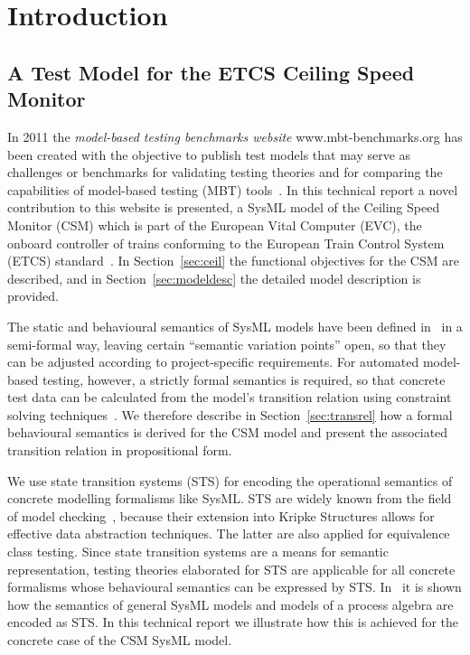 \section{Introduction}\label{sec:intro}

\subsection{A Test Model for the ETCS Ceiling Speed Monitor}
In 2011 the {\it model-based testing benchmarks website} www.mbt-benchmarks.org has been 
created with the objective to publish test models that may serve as challenges or benchmarks 
for validating testing theories   and for comparing the capabilities of model-based testing (MBT) tools~\cite{pel2011a}.
In this technical report a novel contribution to this website is presented, a SysML model
of the Ceiling Speed Monitor (CSM) which is part of the European Vital Computer (EVC), the onboard controller of trains conforming to the European Train Control System (ETCS) standard~\cite{ETCS}. In    Section~\ref{sec:ceil} the functional objectives for the CSM are described, and in Section~\ref{sec:modeldesc} the detailed model description is provided. 

The static and behavioural semantics of SysML models have been defined in~\cite{SysML12,uml_2_4} in a semi-formal way, leaving certain ``semantic variation points'' open, so that they can be adjusted according to project-specific requirements. For automated model-based testing, however, a strictly formal semantics is required, so that concrete test data can be calculated from the model's transition relation using constraint solving techniques~\cite{peleska2013ictss}. 
We therefore describe in Section~\ref{sec:transrel} how a formal behavioural semantics is derived for the CSM model and present the associated transition relation in propositional form.

We use state transition systems (STS) for encoding the operational semantics of concrete
modelling formalisms like SysML. STS are widely known from the field of model checking~\cite{clarke_em-etal:1999a}, because their extension into Kripke Structures allows for effective data abstraction techniques. The latter are also applied for equivalence class testing. 
Since state transition systems are a means for semantic representation, testing theories elaborated for STS are applicable for all concrete formalisms whose behavioural semantics can be expressed by STS. In~\cite{d341} it is shown how the semantics of general SysML models and models of a process algebra are encoded as STS. In this technical report we illustrate  how this is achieved for the concrete case of the CSM SysML model.

